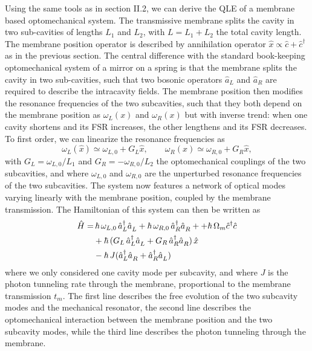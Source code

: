 Using the same tools as in section II.2, we can derive the QLE of a membrane based optomechanical system. The transmissive membrane splits the cavity in two sub-cavities of lengths \(L_1\) and \(L_2\), with \(L=L_1+L_2\) the total cavity length. The membrane position operator is described by annihilation operator $\hat x \propto \hat c + \hat c^{\dagger} $ as in the previous section. The central difference with the standard book-keeping optomechanical system of a mirror on a spring is that the membrane splits the cavity in two sub-cavities, such that two bosonic operators \(\hat a_L\) and \(\hat a_R\) are required to describe the intracavity fields. The membrane position then modifies the resonance frequencies of the two subcavities, such that they both depend on the membrane position as \(\omega_L(x)\) and \(\omega_R(x)\) but with inverse trend: when one cavity shortens and its FSR increases, the other lengthens and its FSR decreases. To first order, we can linearize the resonance frequencies as
\begin{equation}
\omega_L(\hat x) \simeq \omega_{L,0} + G_L \hat x, \qquad \omega_R(x) \simeq \omega_{R,0} + G_R \hat x,
\end{equation}
with \(G_L = \omega_{L,0}/L_1\) and \(G_R = - \omega_{R,0}/L_2\) the optomechanical couplings of the two subcavities, and where \(\omega_{L,0}\) and \(\omega_{R,0}\) are the unperturbed resonance frequencies of the two subcavities. 
The system now features a network of optical modes varying linearly with the membrane position, coupled by the membrane transmission. The Hamiltonian of this system can then be written as 
\begin{equation}
  \begin{split}
    \hat{H} = & \,  \hbar \, \omega_{L,0} \, \hat a_L^\dagger \hat{a}^{\vphantom{\dagger}}_L + \hbar \, \omega_{R,0} \, \hat{a}_R^\dagger \hat{a}_R^{\vphantom{\dagger}} + + \hbar \, \Omega_m \hat c^\dagger \hat c \\
    & + \hbar \,  (G_L \,  \hat a_L^\dagger \hat{a}_L^{\vphantom{\dagger}} + G_R \, \hat a_R^\dagger \hat{a}_R^{\vphantom{\dagger}}) \,  \hat x  \\
    & - \hbar \, J(\hat{a}_L^\dagger \hat{a}_R^{\vphantom{\dagger}} + \hat{a}_R^\dagger \hat{a}_L^{\vphantom{\dagger}})  
  \end{split}
\end{equation}
where we only considered one cavity mode per subcavity, and where \(J\) is the photon tunneling rate through the membrane, proportional to the membrane transmission \(t_m\). The first line describes the free evolution of the two subcavity modes and the mechanical resonator, the second line describes the optomechanical interaction between the membrane position and the two subcavity modes, while the third line describes the photon tunneling through the membrane.


